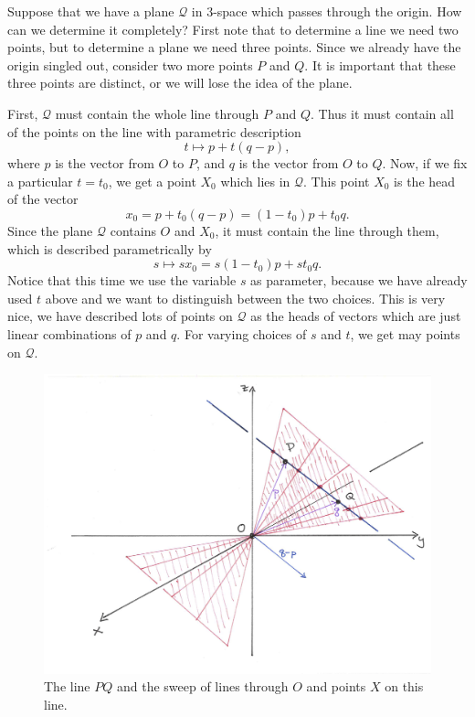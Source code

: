 \documentclass[00-livre-main.tex]{subfiles}
\begin{document}
Suppose that we have a plane $\mathcal{Q}$ in $3$-space which passes through the origin. How can we determine it completely? First note that to determine a line we need two points, but to determine a plane we need three points. Since we already have the origin singled out, consider two more points $P$ and $Q$. It is important that these three points are distinct, or we will lose the idea of the plane. 

First, $\mathcal{Q}$ must contain the whole line through $P$ and $Q$. Thus it must contain all of the points on the line with parametric description
\[
t \mapsto p + t(q-p),
\]
where $p$ is the vector from $O$ to $P$, and $q$ is the vector from $O$ to $Q$. Now, if we fix a particular $t=t_0$, we get a point $X_0$ which lies in $\mathcal{Q}$. This point $X_0$ is the head of the vector 
\[
x_0 = p + t_0 (q-p) = (1-t_0) p + t_0 q.
\]
Since the plane $\mathcal{Q}$ contains $O$ and $X_0$, it must contain the line through them, which is described parametrically by
\[
s \mapsto s x_0 = s(1-t_0) p + st_0 q.
\]
Notice that this time we use the variable $s$ as parameter, because we have already used $t$ above and we want to distinguish between the two choices. This is very nice, we have described lots of points on $\mathcal{Q}$ as the heads of vectors which are just linear combinations of $p$ and $q$. For varying choices of $s$ and $t$, we get may points on $\mathcal{Q}$.

\begin{figure}[ht]
\centering
\includegraphics[width=\textwidth]{images/plane-sweep.png}
\caption{The line $PQ$ and the sweep of lines through $O$ and points $X$ on this line.}
\label{fig:parametric-plane-O}
\end{figure}
\end{document}
